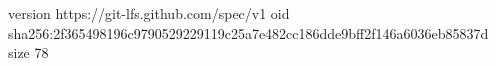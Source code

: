 version https://git-lfs.github.com/spec/v1
oid sha256:2f365498196c9790529229119c25a7e482cc186dde9bff2f146a6036eb85837d
size 78
